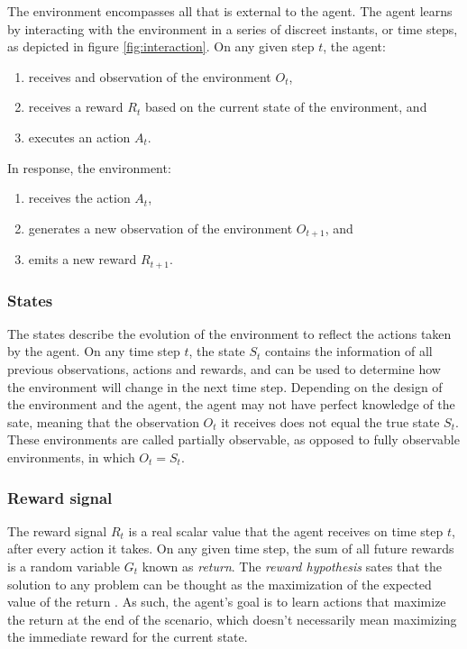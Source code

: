 The environment encompasses all that is external to the agent. The agent learns by interacting with the environment in a series of discreet instants, or time steps, as depicted in figure \ref{fig:interaction}. On any given step $t$, the agent:

\begin{enumerate}
    \item receives and observation of the environment $O_t$,
    \item receives a reward $R_t$ based on the current state of the environment, and
    \item executes an action $A_t$.
\end{enumerate}

In response, the environment:

\begin{enumerate}
    \item receives the action $A_t$,
    \item generates a new observation of the environment $O_{t+1}$, and
    \item emits a new reward $R_{t+1}$.
\end{enumerate}

\subsubsection{States}

The states describe the evolution of the environment to reflect the actions taken by the agent. On any time step $t$, the state $S_t$ contains the information of all previous observations, actions and rewards, and can be used to determine how the environment will change in the next time step. Depending on the design of the environment and the agent, the agent may not have perfect knowledge of the sate, meaning that the observation $O_t$ it receives does not equal the true state $S_t$. These environments are called partially observable, as opposed to fully observable environments, in which $O_t = S_t$.

\subsubsection{Reward signal}

The reward signal $R_t$ is a real scalar value that the agent receives on time step $t$, after every action it takes. On any given time step, the sum of all future rewards is a random variable $G_t$ known as \textit{return}. The \textit{reward hypothesis} sates that the solution to any problem can be thought as the maximization of the expected value of the return \cite{Sutton:2014}. As such, the agent's goal is to learn actions that maximize the return at the end of the scenario, which doesn't necessarily mean maximizing the immediate reward for the current state.

